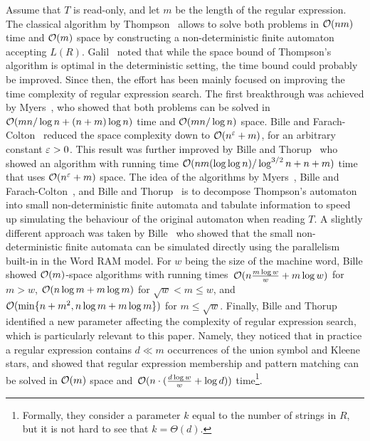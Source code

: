 Assume that $T$ is read-only, and let $m$ be the length of the regular expression. The classical algorithm by Thompson~\cite{Thompson_automaton} allows to solve both problems in $\mathcal{O}(nm)$ time and $\mathcal{O}(m)$ space by constructing a non-deterministic finite automaton accepting $L(R)$. Galil~\cite{10.1007/978-3-642-82456-2_1} noted that while the space bound of Thompson's algorithm is optimal in the deterministic setting, the time bound could probably be improved. Since then, the effort has been mainly focused on improving the time complexity of regular expression search. The first breakthrough was achieved by Myers~\cite{10.1145/128749.128755}, who showed that both problems can be solved in $\mathcal{O}(mn/\log n + (n+m) \log n)$ time and $\mathcal{O}(mn/\log n)$ space. Bille and Farach-Colton~\cite{BILLE2008486} reduced the space complexity down to $\mathcal{O}(n^\varepsilon+m)$, for an arbitrary constant $\varepsilon > 0$. This result was further improved by Bille and Thorup~\cite{10.1007/978-3-642-02927-1_16} who showed an algorithm with running time $\mathcal{O}(nm(\log\log n)/\log^{3/2} n + n+m)$ time that uses $\mathcal{O}(n^\varepsilon+m)$ space. The idea of the algorithms by Myers~\cite{10.1145/128749.128755}, Bille and Farach-Colton~\cite{BILLE2008486}, and Bille and Thorup~\cite{10.1007/978-3-642-02927-1_16} is to decompose Thompson's automaton into small non-deterministic finite automata and tabulate information to speed up simulating the behaviour of the original automaton when reading $T$.
A slightly different approach was taken by 
Bille~\cite{10.1007/11786986_56} who showed that the small non-deterministic finite automata can be simulated directly
using the parallelism built-in in the Word RAM model.
For $w$ being the size of the machine word, Bille showed  $\mathcal{O}(m)$-space algorithms with running times~$\mathcal{O}(n \frac{m \log w}{w} + m \log w)$ for $m > w$,  $\mathcal{O}(n \log m + m \log m)$ for $\sqrt{w} < m \le w$, and~$\mathcal{O}(\min\{n+m^2, n \log m+m \log m\})$ for $m \le \sqrt{w}$. Finally, Bille and Thorup~\cite{doi:10.1137/1.9781611973075.104} identified a new parameter affecting the complexity of regular expression search,
which is particularly relevant to this paper.
Namely, they noticed that in practice a regular expression contains $d \ll m$ occurrences of the union symbol and Kleene stars, and showed that regular expression membership and pattern matching can be solved in $\mathcal{O}(m)$ space and~$\mathcal{O}(n\cdot (\frac{d \log w}{w}+\log d))$ time\footnote{Formally, they consider a parameter $k$ equal to the number of strings in $R$, but it is not hard to see that $k=\Theta(d)$.}.

